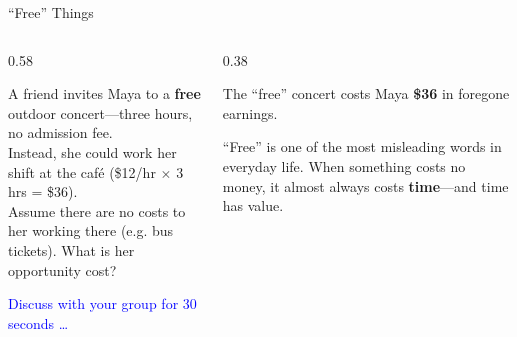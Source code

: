 \documentclass[9pt,english,aspectratio=169]{beamer}
\begin{document}
\begin{frame}{``Free'' Things}

\begin{columns}[T]
    \begin{column}{0.58\textwidth}
        \begin{questionbox}
        A friend invites Maya to a \textbf{free} outdoor concert---three
        hours, no admission fee.\\ 
        
        Instead, she could work her shift at the caf\'{e} (\$12/hr $\times$ 3 hrs
        = \$36).\\ Assume there are no costs to her working there (e.g. bus tickets). What is her opportunity cost? 
        \end{questionbox}
        
        \vspace{0.8em}
        
        \Large\textcolor{blue}{Discuss with your group for 30 seconds \ldots}
        
        \pause 
    \end{column}
    
    \begin{column}{0.38\textwidth} 
        \vspace{0.5em}
        \begin{answerbox}
        The ``free'' concert costs Maya \textbf{\$36} in foregone earnings. 
        \end{answerbox}

        \vspace{0.5em}
        \begin{insightbox}
        ``Free'' is one of the most misleading words in everyday life.
        When something costs no money, it almost always costs \textbf{time}---and
        time has value.
        \end{insightbox}
    \end{column}
\end{columns}
  
\end{frame}
\end{document}
